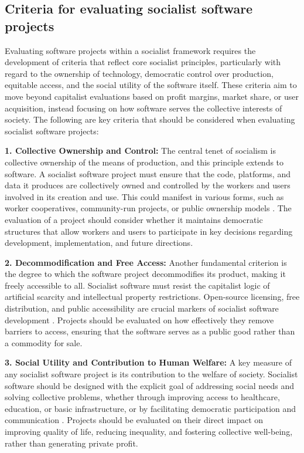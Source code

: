 \begin{refsection}
\subsection{Criteria for evaluating socialist software projects}

Evaluating software projects within a socialist framework requires the development of criteria that reflect core socialist principles, particularly with regard to the ownership of technology, democratic control over production, equitable access, and the social utility of the software itself. These criteria aim to move beyond capitalist evaluations based on profit margins, market share, or user acquisition, instead focusing on how software serves the collective interests of society. The following are key criteria that should be considered when evaluating socialist software projects:

\textbf{1. Collective Ownership and Control:}  
The central tenet of socialism is collective ownership of the means of production, and this principle extends to software. A socialist software project must ensure that the code, platforms, and data it produces are collectively owned and controlled by the workers and users involved in its creation and use. This could manifest in various forms, such as worker cooperatives, community-run projects, or public ownership models \cite[pp.~112]{schweik}. The evaluation of a project should consider whether it maintains democratic structures that allow workers and users to participate in key decisions regarding development, implementation, and future directions.

\textbf{2. Decommodification and Free Access:}  
Another fundamental criterion is the degree to which the software project decommodifies its product, making it freely accessible to all. Socialist software must resist the capitalist logic of artificial scarcity and intellectual property restrictions. Open-source licensing, free distribution, and public accessibility are crucial markers of socialist software development \cite[pp.~85]{stallman2}. Projects should be evaluated on how effectively they remove barriers to access, ensuring that the software serves as a public good rather than a commodity for sale.

\textbf{3. Social Utility and Contribution to Human Welfare:}  
A key measure of any socialist software project is its contribution to the welfare of society. Socialist software should be designed with the explicit goal of addressing social needs and solving collective problems, whether through improving access to healthcare, education, or basic infrastructure, or by facilitating democratic participation and communication \cite[pp.~67]{benkler2}. Projects should be evaluated on their direct impact on improving quality of life, reducing inequality, and fostering collective well-being, rather than generating private profit.


\end{refsection}
